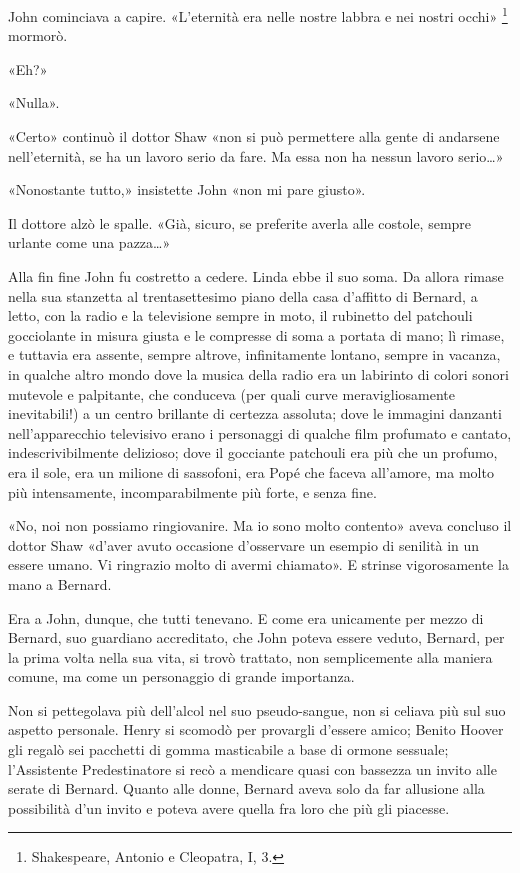 \documentclass[
a5paper, %
10pt, %
twoside, 
onecolumn, %
openany, %
]{memoir}
\begin{document}
John cominciava a capire. «L’eternità era nelle nostre labbra e nei nostri occhi» \footnote{Shakespeare, Antonio e Cleopatra, I, 3.} mormorò.

«Eh?»

«Nulla».

«Certo» continuò il dottor Shaw «non si può permettere alla gente di andarsene nell’eternità, se ha un lavoro serio da fare. Ma essa non ha nessun lavoro serio…»

«Nonostante tutto,» insistette John «non mi pare giusto».

Il dottore alzò le spalle. «Già, sicuro, se preferite averla alle costole, sempre urlante come una pazza…»

Alla fin fine John fu costretto a cedere. Linda ebbe il suo soma. Da allora rimase nella sua stanzetta al trentasettesimo piano della casa d’affitto di Bernard, a letto, con la radio e la televisione sempre in moto, il rubinetto del patchouli gocciolante in misura giusta e le compresse di soma a portata di mano; lì rimase, e tuttavia era assente, sempre altrove, infinitamente lontano, sempre in vacanza, in qualche altro mondo dove la musica della radio era un labirinto di colori sonori mutevole e palpitante, che conduceva (per quali curve meravigliosamente inevitabili!) a un centro brillante di certezza assoluta; dove le immagini danzanti nell’apparecchio televisivo erano i personaggi di qualche film profumato e cantato, indescrivibilmente delizioso; dove il gocciante patchouli era più che un profumo, era il sole, era un milione di sassofoni, era Popé che faceva all’amore, ma molto più intensamente, incomparabilmente più forte, e senza fine.

«No, noi non possiamo ringiovanire. Ma io sono molto contento» aveva concluso il dottor Shaw «d’aver avuto occasione d’osservare un esempio di senilità in un essere umano. Vi ringrazio molto di avermi chiamato». E strinse vigorosamente la mano a Bernard.

Era a John, dunque, che tutti tenevano. E come era unicamente per mezzo di Bernard, suo guardiano accreditato, che John poteva essere veduto, Bernard, per la prima volta nella sua vita, si trovò trattato, non semplicemente alla maniera comune, ma come un personaggio di grande importanza.

Non si pettegolava più dell’alcol nel suo pseudo-sangue, non si celiava più sul suo aspetto personale. Henry si scomodò per provargli d’essere amico; Benito Hoover gli regalò sei pacchetti di gomma masticabile a base di ormone sessuale; l’Assistente Predestinatore si recò a mendicare quasi con bassezza un invito alle serate di Bernard. Quanto alle donne, Bernard aveva solo da far allusione alla possibilità d’un invito e poteva avere quella fra loro che più gli piacesse.
\end{document}
